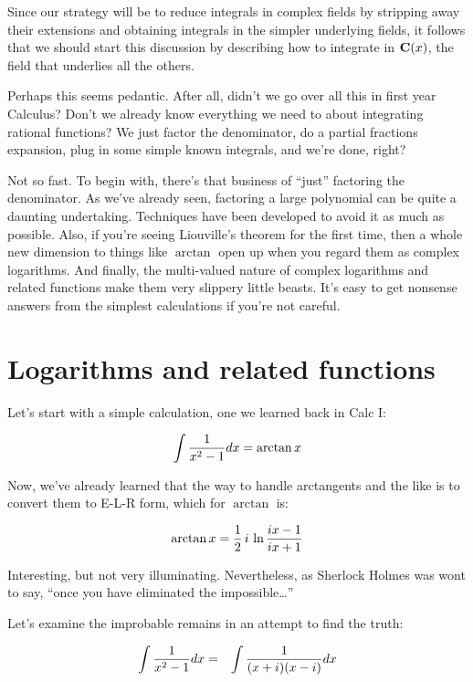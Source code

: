 

Since our strategy will be to reduce integrals in complex fields by
stripping away their extensions and obtaining integrals in the simpler
underlying fields, it follows that we should start this discussion by
describing how to integrate in ${\bf C}(x)$, the field that underlies
all the others.

Perhaps this seems pedantic.  After all, didn't we go over all this in
first year Calculus?  Don't we already know everything we need to
about integrating rational functions?  We just factor the denominator,
do a partial fractions expansion, plug in some simple known integrals,
and we're done, right?

Not so fast.  To begin with, there's that business of ``just''
factoring the denominator.  As we've already seen, factoring a large
polynomial can be quite a daunting undertaking.  Techniques have been
developed to avoid it as much as possible.  Also, if you're seeing
Liouville's theorem for the first time, then a whole new dimension to
things like $\arctan$ open up when you regard them as complex
logarithms.  And finally, the multi-valued nature of complex
logarithms and related functions make them very slippery little
beasts.  It's easy to get nonsense answers from the simplest
calculations if you're not careful.

\section{Logarithms and related functions}

Let's start with a simple calculation, one we learned back in Calc I:

$$\int{1\over{x^2-1}}dx = \arctan x$$

Now, we've already learned that the way to handle arctangents and the
like is to convert them to E-L-R form, which for $\arctan$ is:

$$\arctan x = {1\over2}\,i\,\ln {{ix-1}\over{ix+1}}$$

Interesting, but not very illuminating.  Nevertheless, as Sherlock
Holmes was wont to say, ``once you have eliminated the impossible\ldots''

Let's examine the improbable remains in an attempt to find the truth:

\begin{eqnarray*}
\int{1\over{x^2-1}} dx &=& \int{1\over{(x+i)(x-i)}} dx \\
\end{eqnarray*}

